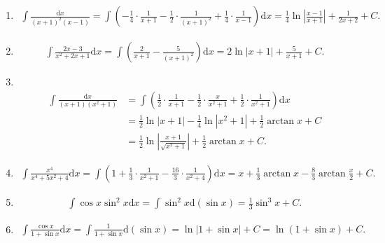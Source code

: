 \begin{solution}
\begin{enumerate}
    \item[19.]
    \[
    \begin{aligned}
    \int\frac{\mathrm{d}x}{(x+1)^2(x-1)}=\int\left(-\frac{1}{4}\cdot\frac{1}{x+1}-\frac{1}{2}\cdot\frac{1}{(x+1)^2}+\frac{1}{4}\cdot\frac{1}{x-1}\right)\mathrm{d}x=\frac{1}{4}\ln\left|\frac{x-1}{x+1}\right|+\frac{1}{2x+2}+C.
    \end{aligned}
    \]

    \item[20.]
    \[
    \begin{aligned}
    \int\frac{2x-3}{x^2+2x+1}\mathrm{d}x=\int\left(\frac{2}{x+1}-\frac{5}{(x+1)^2}\right)\mathrm{d}x=2\ln\left|x+1\right|+\frac{5}{x+1}+C.
    \end{aligned}
    \]

    \item[21.]\\
    \[
    \begin{aligned}
    \int\frac{\mathrm{d}x}{(x+1)(x^2+1)}&=\int\left(\frac{1}{2}\cdot\frac{1}{x+1}-\frac{1}{2}\cdot\frac{x}{x^2+1}+\frac{1}{2}\cdot\frac{1}{x^2+1}\right)\mathrm{d}x\\
    &=\frac{1}{2}\ln\left|x+1\right|-\frac{1}{4}\ln\left|x^2+1\right|+\frac{1}{2}\arctan{x}+C\\
    &=\frac{1}{2}\ln\left|\frac{x+1}{\sqrt{x^2+1}}\right|+\frac{1}{2}\arctan{x}+C.
    \end{aligned}
    \]

    \item[22.]
    \[
    \begin{aligned}
    \int\frac{x^4}{x^4+5x^2+4}\mathrm{d}x=\int\left(1+\frac{1}{3}\cdot\frac{1}{x^2+1}-\frac{16}{3}\cdot\frac{1}{x^2+4}\right)\mathrm{d}x=x+\frac{1}{3}\arctan{x}-\frac{8}{3}\arctan{\frac{x}{2}}+C.
    \end{aligned}
    \]

    \item[23.]
    \[
    \begin{aligned}
    \int\cos{x}\sin^2{x}\mathrm{d}x=\int \sin^2{x}\mathrm{d}(\sin{x})=\frac{1}{3}\sin^3{x}+C.
    \end{aligned}
    \]

    \item[24.]
    \[
    \begin{aligned}
    \int\frac{\cos{x}}{1+\sin{x}}\mathrm{d}x=\int\frac{1}{1+\sin{x}}\mathrm{d}(\sin{x})=\ln\left|1+\sin{x}\right|+C=\ln\left(1+\sin{x}\right)+C.
    \end{aligned}
    \]


\end{enumerate}
\end{solution}
